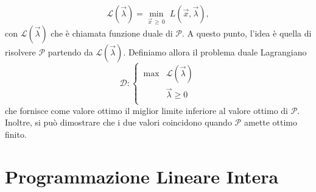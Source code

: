 \begin{equation}
    \mathcal{L}(\vec{\lambda}) = \min_{\vec{x}\,
    \ge \,0}\; L(\vec{x}, \vec{\lambda}),
\end{equation}
con $\mathcal{L}(\vec{\lambda})$ che è chiamata funzione duale di
$\mathcal{P}$. A questo punto, l'idea è quella di risolvere $\mathcal{P}$
partendo da $\mathcal{L}(\vec{\lambda})$. Definiamo allora il problema
duale Lagrangiano
\begin{equation}
    \mathcal{D}\colon
    \begin{cases}
       \,\max & \mathcal{L}(\vec{\lambda}) \\
              & \vec{\lambda} \ge 0 \\
    \end{cases}
\end{equation}
che fornisce come valore ottimo il miglior limite inferiore al valore
ottimo di $\mathcal{P}$. Inoltre, si può dimostrare che i due valori
coincidono quando $\mathcal{P}$ amette ottimo finito.

\section{Programmazione Lineare Intera}

